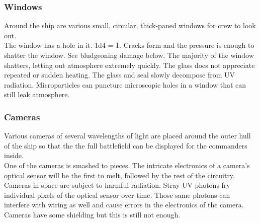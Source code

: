 \documentclass[a4paper]{article}
\begin{document}
\vspace{-0.5cm} \hspace{-18pt} \subsubsection{Windows} \label{outer_windows} \vspace{-0.2cm}
Around the ship are various small, circular, thick-paned windows for crew to look out.
\\ \pbhw
{The window has a hole in it. \newline 1d4 = 1. Cracks form and the pressure is enough to shatter the window. See bludgeoning damage below.}
{The majority of the window shatters, letting out atmosphere extremely quickly.}
{The glass does not appreciate repeated or sudden heating.}
{The glass and seal slowly decompose from UV radiation. Microparticles can puncture microscopic holes in a window that can still leak atmosphere.}


\vspace{-0.5cm} \hspace{-18pt} \subsubsection{Cameras} \label{outer_cameras} \vspace{-0.2cm}
Various cameras of several wavelengths of light are placed around the outer hull of the ship so that the the full battlefield can be displayed for the commanders inside.
\\ \pbhw
{}
{One of the cameras is smashed to pieces.}
{The intricate electronics of a camera's optical sensor will be the first to melt, followed by the rest of the circuitry.}
{Cameras in space are subject to harmful radiation. Stray UV photons fry individual pixels of the optical sensor over time. Those same photons can interfere with wiring as well and cause errors in the electronics of the camera. Cameras have some shielding but this is still not enough.}
\end{document}
